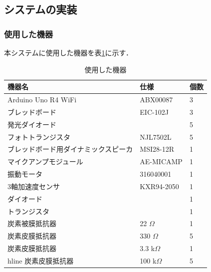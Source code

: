 \subsection{システムの実装}
\label{implementation}
\subsubsection{使用した機器}
本システムに使用した機器を表\ref{table:devices}に示す．

\begin{table}[ht]
    \centering
    \caption{使用した機器}
    \label{table:devices}
    \begin{tabular}{|l|l|l|} \hline
        機器名                            &仕様          &個数  \\ \hline
        Arduino Uno R4 WiFi              &ABX00087     &3  \\ \hline
        ブレッドボード                      &EIC-102J      &3  \\ \hline
        発光ダイオード                      &              &5  \\ \hline
        フォトトランジスタ                  &NJL7502L       &5  \\ \hline
        ブレッドボード用ダイナミックスピーカ   &MSI28-12R      &1  \\ \hline
        マイクアンプモジュール               &AE-MICAMP      &1  \\ \hline
        振動モータ                         &316040001      &1  \\ \hline
        3軸加速度センサ                    &KXR94-2050      &1  \\ \hline
        ダイオード                        &                &1  \\ \hline
        トランジスタ                       &                &1  \\ \hline
        炭素被膜抵抗器                     &22 $\Omega$     &1 \\ \hline
        炭素皮膜抵抗器                     &330 $\Omega$    &5 \\ \hline
        炭素皮膜抵抗器                     &3.3 k$\Omega$   &1 \\ hline
        炭素皮膜抵抗器                     &100 k$\Omega$   &5 \\ \hline
    \end{tabular}
\end{table}



